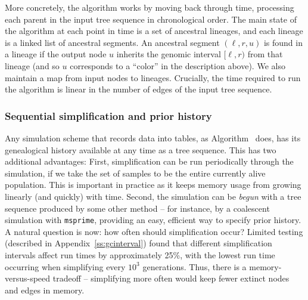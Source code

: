 \documentclass{article}
\newcommand{\msprime}{\texttt{msprime}}
\newcommand{\krt}[1]{{\em \color{green} #1}}
\begin{document}
More concretely,
the algorithm works by moving back through time,
processing each parent in the input tree sequence in chronological order.
The main state of the algorithm at each point in time is a set of ancestral lineages,
and each lineage is a linked list of ancestral segments.
An ancestral segment $(\ell, r, u)$ is found in a lineage
if the output node $u$ inherits the genomic interval $[\ell, r)$ from that lineage
(and so $u$ corresponds to a ``color'' in the description above).
We also maintain a map from input nodes to lineages. %
Crucially, the time required to run the algorithm is
linear in the number of edges of the input tree sequence.

\subsubsection*{Sequential simplification and prior history}
\label{ss:seq_simp}

Any simulation scheme that records data into tables,
as Algorithm~ does,
has its genealogical history available at any time as a tree sequence.
This has two additional advantages:
First, simplification can be run periodically through the simulation,
if we take the set of samples to be the entire currently alive population.
This is important in practice as it keeps memory usage from growing linearly (and quickly) with time.
Second, the simulation can
be \emph{begun} with a tree sequence produced by some other method -- for
instance, by a coalescent simulation with \msprime,
providing an easy, efficient way to specify prior history.
A natural question is now: how often should simplification occur?
Limited testing (described in Appendix~\ref{ss:gcinterval})
found that different simplification intervals affect run times by approximately
25\%, with the lowest run time occurring when simplifying every $10^3$ generations.
Thus, there is a memory-versus-speed tradeoff
-- simplifying more often would keep fewer extinct nodes and edges in memory.

%
\end{document}

